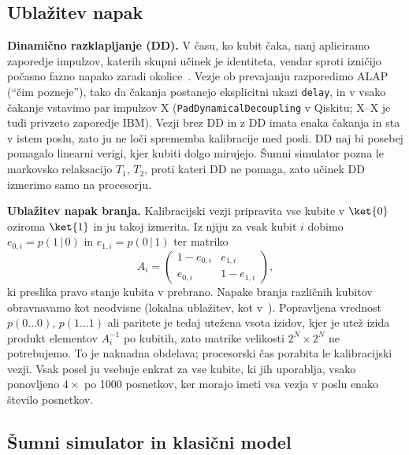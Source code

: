 \subsection{Ublažitev napak}
\label{g20:sec:ublazitev}

\textbf{Dinamično razklapljanje (DD).} V času, ko kubit čaka, nanj apliciramo zaporedje impulzov, katerih skupni učinek je
identiteta, vendar sproti izničijo počasno fazno napako zaradi okolice~\cite{g20:viola1999, g20:ezzell2023}. Vezje ob
prevajanju razporedimo ALAP (\enquote{čim pozneje}), tako da čakanja postanejo eksplicitni ukazi \texttt{delay}, in v vsako
čakanje vstavimo par impulzov X (\texttt{PadDynamicalDecoupling} v Qiskitu; X--X je tudi privzeto zaporedje IBM). Vezji brez
DD in z DD imata enaka čakanja in sta v istem poslu, zato ju ne loči sprememba kalibracije med posli. DD naj bi posebej
pomagalo linearni verigi, kjer kubiti dolgo mirujejo. Šumni simulator pozna le markovsko relaksacijo $T_1$, $T_2$, proti kateri
DD ne pomaga, zato učinek DD izmerimo samo na procesorju.

\textbf{Ublažitev napak branja.} Kalibracijski vezji pripravita vse kubite v $\ket{0}$ oziroma $\ket{1}$ in ju takoj izmerita.
Iz njiju za vsak kubit $i$ dobimo $e_{0,i}=p(1\,|\,0)$ in $e_{1,i}=p(0\,|\,1)$ ter matriko
\begin{equation}
A_i=\begin{pmatrix}1-e_{0,i} & e_{1,i}\\ e_{0,i} & 1-e_{1,i}\end{pmatrix},
\label{g20:eq:branje}
\end{equation}
ki preslika pravo stanje kubita v prebrano. Napake branja različnih kubitov obravnavamo kot neodvisne (lokalna ublažitev,
kot v~\cite{g20:mooney2021}). Popravljena vrednost $p(0\dots0)$, $p(1\dots1)$ ali paritete je tedaj utežena vsota izidov, kjer
je utež izida produkt elementov $A_i^{-1}$ po kubitih, zato matrike velikosti $2^N\times2^N$ ne potrebujemo. To je naknadna
obdelava; procesorski čas porabita le kalibracijski vezji. Vsak posel ju vsebuje enkrat za vse kubite, ki jih uporablja, vsako
ponovljeno $4\times$ po 1000 posnetkov, ker morajo imeti vsa vezja v poslu enako število posnetkov.

\subsection{Šumni simulator in klasični model}
\label{g20:sec:model}

